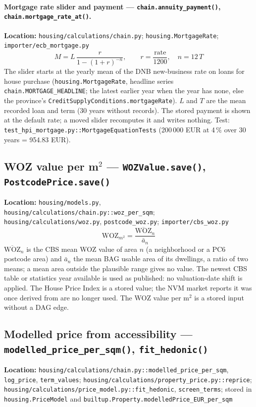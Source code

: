 \documentclass[11pt]{article}
\newcommand{\code}[1]{\texttt{#1}}
\begin{document}
\paragraph{Mortgage rate slider and payment --- \code{chain.annuity\_payment()}, \code{chain.mortgage\_rate\_at()}.}
\textbf{Location:} \code{housing/calculations/chain.py}; \code{housing.MortgageRate}; \code{importer/ecb\_mortgage.py}
\begin{equation}
  M = L\,\frac{r}{1-(1+r)^{-n}}, \qquad r = \frac{\text{rate}}{1200}, \quad n = 12\,T
\end{equation}
The slider starts at the yearly mean of the DNB new-business rate on loans for house purchase (\code{housing.MortgageRate}, headline series \code{chain.MORTGAGE\_HEADLINE}; the latest earlier year when the year has none, else the province's \code{CreditSupplyConditions.mortgageRate}). $L$ and $T$ are the mean recorded loan and term (30 years without records). The stored payment is shown at the default rate; a moved slider recomputes it and writes nothing. Test: \code{test\_hpi\_mortgage.py::MortgageEquationTests} (200\,000 EUR at 4\,\% over 30 years = 954.83 EUR).

\subsection{WOZ value per m$^2$ --- \code{WOZValue.save()}, \code{PostcodePrice.save()}}
\textbf{Location:} \code{housing/models.py}, \code{housing/calculations/chain.py::woz\_per\_sqm}; \code{housing/calculations/woz.py}, \code{postcode\_woz.py}; \code{importer/cbs\_woz.py}
\begin{equation}
  \text{WOZ}_{m^2} = \frac{\overline{\text{WOZ}}_n}{\bar a_n}
\end{equation}
$\overline{\text{WOZ}}_n$ is the CBS mean WOZ value of area $n$ (a neighborhood or a PC6 postcode area) and $\bar a_n$ the mean BAG usable area of its dwellings, a ratio of two means; a mean area outside the plausible range gives no value. The newest CBS table or statistics year available is used as published: no valuation-date shift is applied. The House Price Index is a stored value; the NVM market reports it was once derived from are no longer used. The WOZ value per m$^2$ is a stored input without a DAG edge.

\subsection{Modelled price from accessibility --- \code{modelled\_price\_per\_sqm()}, \code{fit\_hedonic()}}
\textbf{Location:} \code{housing/calculations/chain.py::modelled\_price\_per\_sqm}, \code{log\_price}, \code{term\_values}; \code{housing/calculations/property\_price.py::reprice}; \code{housing/calculations/price\_model.py::fit\_hedonic}, \code{screen\_terms}; stored in \code{housing.PriceModel} and \code{builtup.Property.modelledPrice\_EUR\_per\_sqm}
\end{document}
